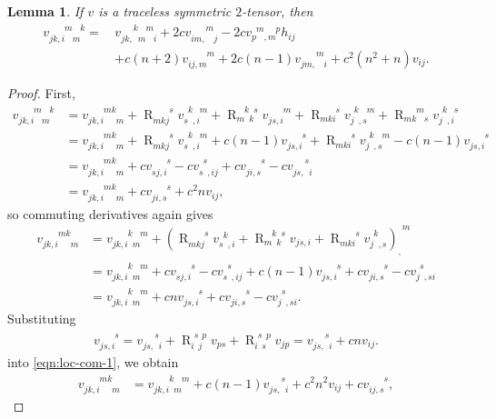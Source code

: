 \documentclass[10pt,reqno]{amsart}
\newtheorem{lemma}[theorem]{Lemma}
\DeclareMathOperator{\R}{R}
\newcommand{\riem}{\R}
\newcommand{\riemdudu}[4]{\riem^{\phantom{#1} #2 \phantom{#3} #4}_{#1 \phantom{#2} #3}}
\newcommand{\riemddud}[4]{\riem^{\phantom{#1 #2} #3}_{#1 #2 \phantom{#3} #4}}
\newcommand{\riemdddu}[4]{\riem^{\phantom{#1 #2 #3} #4}_{#1 #2 #3}}
\newcommand{\vdud}[3]{v_{#1\phantom{#2},#3}^{\phantom{#1}#2}}
\newcommand{\vdddu}[4]{v_{#1 #2, #3}^{\phantom{#1#2,#3} #4}}
\newcommand{\vddud}[4]{v_{#1 #2, \phantom{#3} #4}^{\phantom{#1#2,} #3 \phantom{#4}}}
\newcommand{\vdudd}[4]{v_{#1 \phantom{#2}, #3 #4}^{\phantom{#1} #2 \phantom{, #3 #4}}}
\newcommand{\vdudu}[4]{v_{#1 \phantom{#2}, #3 \phantom{#4}}^{\phantom{#1} #2 \phantom{, #3} #4}}
\newcommand{\vdddudu}[6]{v_{#1#2,#3\phantom{#4}#5\phantom{#6}}^{\phantom{#1#2,#3}#4\phantom{#5}#6}}
\newcommand{\vddduud}[6]{v_{#1#2,#3\phantom{#4#5}#6}^{\phantom{#1#2,#3}#4#5\phantom{#6}}}
\newcommand{\vddudud}[6]{v_{#1#2,\phantom{#3}#4\phantom{#5}#6}^{\phantom{#1#2,}#3\phantom{#4}#5}}
\begin{document}
\begin{lemma} If $v$ is a traceless symmetric $2$-tensor, then
\begin{align}
\label{eqn:commut-trfree}
\vdddudu{j}{k}{i}{m}{m}{k} = \, & \vddudud{j}{k}{k}{m}{m}{i} +  2c \vddud{i}{m}{m}{j} - 2c \vdudu{p}{m}{m}{p} h_{ij} \nonumber \\ & 
+ c (n+2) \vdddu{i}{j}{m}{m} + 2c(n-1) \vddud{j}{m}{m}{i} + c^2 (n^2+n) v_{ij}.
\end{align}
 \end{lemma}
 \begin{proof} First, 
\begin{align} \label{eqn:loc-com-0}
\vdddudu{j}{k}{i}{m}{m}{k} &= \vddduud{j}{k}{i}{m}{k}{m} + \riemdddu{m}{k}{j}{s} \vdudu{s}{k}{i}{m} + \riemdudu{m}{k}{k}{s} \vdddu{j}{s}{i}{m} + \riemdddu{m}{k}{i}{s} \vdudu{j}{k}{s}{m} + \riemddud{m}{k}{m}{s} \vdudu{j}{k}{i}{s}\nonumber \\
&= \vddduud{j}{k}{i}{m}{k}{m} +\riemdddu{m}{k}{j}{s} \vdudu{s}{k}{i}{m} + c(n-1) \vdddu{j}{s}{i}{s}  + \riemdddu{m}{k}{i}{s} \vdudu{j}{k}{s}{m} -c(n-1) \vdddu{j}{s}{i}{s} \nonumber  \\
&= \vddduud{j}{k}{i}{m}{k}{m} + c \vdddu{s}{j}{i}{s}  - c \vdudd{s}{s}{i}{j}  + c \vdddu{j}{i}{s}{s}  - c \vddud{j}{s}{s}{i}  \nonumber \\
 &= \vddduud{j}{k}{i}{m}{k}{m} + 
  c \vdddu{j}{i}{s}{s} + c^2 n v_{i j},
\end{align}
so commuting derivatives again gives
\begin{align} \label{eqn:loc-com-1}
\vddduud{j}{k}{i}{m}{k}{m} &= 
\vdddudu{j}{k}{i}{k}{m}{m}  + (\riemdddu{m}{k}{j}{s} \vdud{s}{k}{i}  + \riemdudu{m}{k}{k}{s} v_{{j}{s},{i}} + \riemdddu{m}{k}{i}{s} \vdud{j}{k}{s})_{,}^{\phantom{,}m} \nonumber \\
&= \vdddudu{j}{k}{i}{k}{m}{m}  + c \vdddu{s}{j}{i}{s}  - c \vdudd{s}{s}{i}{j}  + c(n-1) \vdddu{j}{s}{i}{s}  +  c \vdddu{j}{i}{s}{s} - c \vdudd{j}{s}{s}{i} \nonumber \\
&= \vdddudu{j}{k}{i}{k}{m}{m}  + cn \vdddu{j}{s}{i}{s}  +  c \vdddu{j}{i}{s}{s}  - c \vdudd{j}{s}{s}{i}.
\end{align}
Substituting 
\begin{align*}
\vdddu{j}{s}{i}{s}  = \vddud{j}{s}{s}{i} + \riemdudu{i}{s}{j}{p}  v_{ps} + \riemdudu{i}{s}{s}{p} v_{jp}  = \vddud{j}{s}{s}{i} + cn v_{ij}.
\end{align*}
into \eqref{eqn:loc-com-1}, we obtain
\begin{align*}
\vddduud{j}{k}{i}{m}{k}{m} &= \vdddudu{j}{k}{i}{k}{m}{m} + c(n-1) \vddud{j}{s}{s}{i} + c^2 n^2 v_{ij}  +  c \vdddu{i}{j}{s}{s},

\end{align*}
\end{proof}
\end{document}
